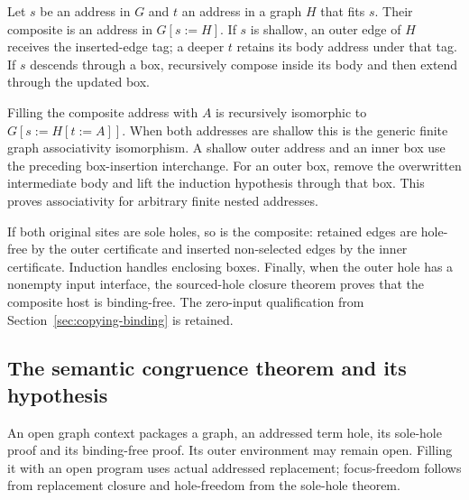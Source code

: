 







Let $s$ be an address in $G$ and $t$ an address in a graph $H$ that fits $s$.
Their composite is an address in $G[s:=H]$. If $s$ is shallow, an outer
edge of $H$ receives the inserted-edge tag; a deeper $t$ retains its body
address under that tag. If $s$ descends through a box, recursively compose
inside its body and then extend through the updated box.

Filling the composite address with $A$ is recursively isomorphic to
$G[s:=H[t:=A]]$. When both addresses are shallow this is the generic finite
graph associativity isomorphism. A shallow outer address and an inner box
use the preceding box-insertion interchange. For an outer box, remove the
overwritten intermediate body and lift the induction hypothesis through
that box. This proves associativity for arbitrary finite nested addresses.

If both original sites are sole holes, so is the composite: retained edges
are hole-free by the outer certificate and inserted non-selected edges by
the inner certificate. Induction handles enclosing boxes. Finally, when
the outer hole has a nonempty input interface, the sourced-hole closure
theorem proves that the composite host is binding-free. The zero-input
qualification from Section~\ref{sec:copying-binding} is retained.









\subsection{The semantic congruence theorem and its hypothesis}


An open graph context packages a graph, an addressed term hole, its
sole-hole proof and its binding-free proof. Its outer environment may remain
open. Filling it with an open program uses actual addressed replacement;
focus-freedom follows from replacement closure and hole-freedom from the
sole-hole theorem.

